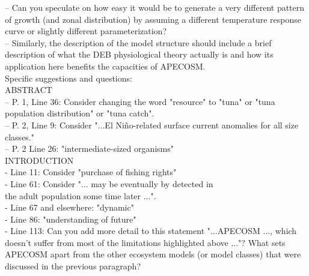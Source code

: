 \documentclass[12pt]{article}
\begin{document}

-- Can you speculate on how easy it would be to generate a very different pattern of growth (and zonal distribution) by assuming a different temperature response curve or slightly different parameterization?\\


-- Similarly, the description of the model structure should include a brief description of what the DEB physiological theory actually is and how its application here benefits the capacities of APECOSM.\\


Specific suggestions and questions:\\

ABSTRACT\\

-- P. 1, Line 36: Consider changing the word "resource" to "tuna" or "tuna population distribution" or "tuna catch".\\

-- P. 2, Line 9: Consider "...El Niño-related surface current anomalies for all size classes."\\

-- P. 2 Line 26: "intermediate-sized organisms"\\

INTRODUCTION\\

- Line 11: Consider "purchase of fishing rights"\\

- Line 61: Consider "... may be eventually by detected in\\ the adult population some time later ...".\\

- Line 67 and elsewhere: "dynamic"\\

- Line 86: "understanding of future" \\

- Line 113: Can you add more detail to this statement "...APECOSM ..., which doesn't suffer from most of the limitations highlighted above ..."? What sets APECOSM apart from the other ecosystem models (or model classes) that were discussed in the previous paragraph?\\
\end{document}
